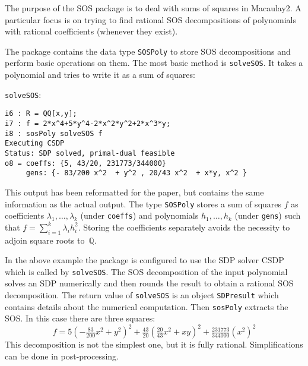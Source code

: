 \documentclass[11pt]{amsart}
\theoremstyle{plain}%
\theoremstyle{definition}
\theoremstyle{remark}
\newcommand{\SOS}{\textsc{SOS}\xspace}
\newcommand{\QQ}{\mathbb{Q}}
\begin{document}
The purpose of the \SOS package is to deal with sums of squares in Macaulay2.
A particular focus is on trying to find rational SOS decompositions of polynomials with rational coefficients (whenever they exist).

The package contains the data type \verb|SOSPoly| to store SOS decompositions and perform basic operations on them.
The most basic method is \verb|solveSOS|.
It takes a polynomial and tries to write it as a sum of squares:
{\small
\verb|solveSOS|:
\begin{verbatim}
i6 : R = QQ[x,y];
i7 : f = 2*x^4+5*y^4-2*x^2*y^2+2*x^3*y;
i8 : sosPoly solveSOS f
Executing CSDP
Status: SDP solved, primal-dual feasible
o8 = coeffs: {5, 43/20, 231773/344000}              
     gens: {- 83/200 x^2  + y^2 , 20/43 x^2  + x*y, x^2 }
\end{verbatim}
}
This output has been reformatted for the paper, but contains the same information as the actual output.
The type \verb|SOSPoly| stores a sum of squares $f$ as coefficients $\lambda_{1},\dots,\lambda_{k}$ (under \verb|coeffs|) and polynomials $h_{1},\dots,h_{k}$ (under \verb|gens|) such that $f = \sum_{i=1}^{k}\lambda_{i}h_{i}^{2}$.
Storing the coefficients separately avoids the necessity to adjoin square roots to~$\QQ$.

In the above example the package is configured to use the SDP solver CSDP which is called by \verb|solveSOS|.
The SOS decomposition of the input polynomial solves an SDP numerically and then rounds the result to obtain a rational SOS decomposition.
The return value of \verb|solveSOS| is an object \verb|SDPresult| which contains details about the numerical computation.
Then \verb|sosPoly| extracts the SOS.
In this case there are three squares:
\[
  f = 5(-\tfrac{83}{200} x^{2}+y^{2})^{2} + \tfrac{43}{20}
  (\tfrac{20}{43}x^{2} + xy)^{2} + \tfrac{231773}{344000} (x^{2})^{2}
\]
This decomposition is not the simplest one, but it is fully rational. 
Simplifications can be done in post-processing.
\end{document}
